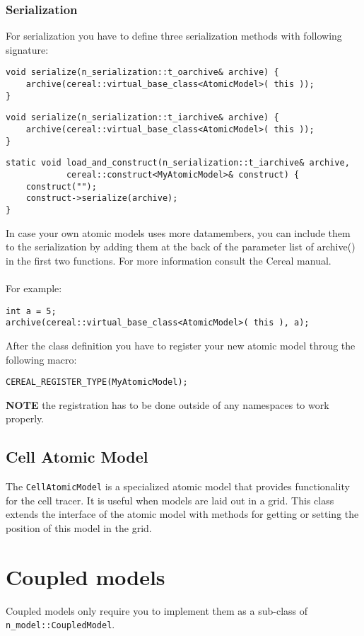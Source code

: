 \subsubsection{Serialization}
For serialization you have to define three serialization methods with following signature: 
\begin{lstlisting}
void serialize(n_serialization::t_oarchive& archive) {
	archive(cereal::virtual_base_class<AtomicModel>( this ));
}
\end{lstlisting}
\begin{lstlisting}
void serialize(n_serialization::t_iarchive& archive) {
	archive(cereal::virtual_base_class<AtomicModel>( this ));
}
\end{lstlisting}
\begin{lstlisting}
static void load_and_construct(n_serialization::t_iarchive& archive,
			cereal::construct<MyAtomicModel>& construct) {
	construct("");
	construct->serialize(archive);
}
\end{lstlisting}
In case your own atomic models uses more datamembers, you can include them to the serialization by adding them at the back of the parameter list of archive() in the first two functions. For more information consult the Cereal manual.\\
\\ 
For example:
\begin{lstlisting}
int a = 5;
archive(cereal::virtual_base_class<AtomicModel>( this ), a);
\end{lstlisting}
After the class definition you have to register your new atomic model throug the following macro: 
\begin{lstlisting}
CEREAL_REGISTER_TYPE(MyAtomicModel);
\end{lstlisting}

\textbf{NOTE} the registration has to be done outside of any namespaces to work properly.

\subsection{Cell Atomic Model}
The \texttt{CellAtomicModel} is a specialized atomic model that provides functionality for the cell tracer. It is useful when models are laid out in a grid. This class extends the interface of the atomic model with methods for getting or setting the position of this model in the grid.

\section{Coupled models}
Coupled models only require you to implement them as a sub-class of \\ \texttt{n\_model::CoupledModel}.

